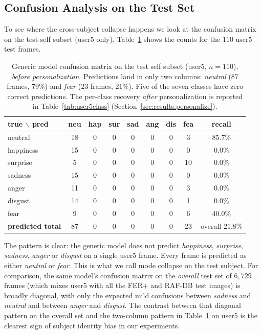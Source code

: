 \documentclass[12pt,a4paper]{article}
\begin{document}
\subsection{Confusion Analysis on the Test Set}
\label{sec:results:confusion}

To see where the cross-subject collapse happens we look at the
confusion matrix on the test self subset (user5 only).
Table~\ref{tab:selfconf} shows the counts for the $110$ user5
test frames.

\begin{table}[H]
  \centering
  \footnotesize
  \begin{tabular}{l|ccccccc|c}
    \toprule
    true $\backslash$ pred & neu & hap & sur & sad & ang & dis & fea & recall \\
    \midrule
    neutral   & 18 & 0 & 0 & 0 & 0 & 0 & 3  & $85.7\%$ \\
    happiness & 15 & 0 & 0 & 0 & 0 & 0 & 0  & $0.0\%$ \\
    surprise  & 5  & 0 & 0 & 0 & 0 & 0 & 10 & $0.0\%$ \\
    sadness   & 15 & 0 & 0 & 0 & 0 & 0 & 0  & $0.0\%$ \\
    anger     & 11 & 0 & 0 & 0 & 0 & 0 & 3  & $0.0\%$ \\
    disgust   & 14 & 0 & 0 & 0 & 0 & 0 & 1  & $0.0\%$ \\
    fear      & 9  & 0 & 0 & 0 & 0 & 0 & 6  & $40.0\%$ \\
    \midrule
    \textbf{predicted total} & 87 & 0 & 0 & 0 & 0 & 0 & 23 & overall $21.8\%$ \\
    \bottomrule
  \end{tabular}
  \caption{Generic model confusion matrix on the test self
  subset (user5, $n=110$), \emph{before personalization}.
  Predictions land in only two columns: \emph{neutral}
  ($87$ frames, $79\%$) and \emph{fear} ($23$ frames, $21\%$).
  Five of the seven classes have zero correct predictions.
  The per-class recovery \emph{after} personalization is
  reported in Table~\ref{tab:user5class}
  (Section~\ref{sec:results:personalize}).}
  \label{tab:selfconf}
\end{table}

The pattern is clear: the generic model does not predict
\emph{happiness}, \emph{surprise}, \emph{sadness},
\emph{anger} or \emph{disgust} on a single user5 frame. Every
frame is predicted as either \emph{neutral} or \emph{fear}.
This is what we call mode collapse on the test subject. For
comparison, the same model's confusion matrix on the
\emph{overall} test set of $6{,}729$ frames (which mixes
user5 with all the FER+ and RAF-DB test images) is broadly
diagonal, with only the expected mild confusions between
\emph{sadness} and \emph{neutral} and between \emph{anger}
and \emph{disgust}. The contrast between that diagonal
pattern on the overall set and the two-column pattern in
Table~\ref{tab:selfconf} on user5 is the clearest sign of
subject identity bias in our experiments.
\end{document}

